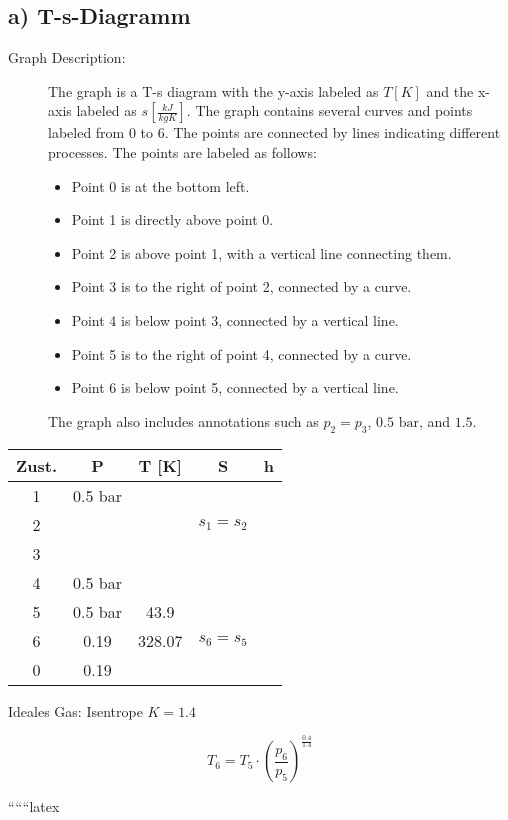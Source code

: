 \subsection*{a) T-s-Diagramm}

\begin{description}
    \item[Graph Description:] The graph is a T-s diagram with the y-axis labeled as $T [K]$ and the x-axis labeled as $s \left[ \frac{kJ}{kgK} \right]$. The graph contains several curves and points labeled from 0 to 6. The points are connected by lines indicating different processes. The points are labeled as follows:
    \begin{itemize}
        \item Point 0 is at the bottom left.
        \item Point 1 is directly above point 0.
        \item Point 2 is above point 1, with a vertical line connecting them.
        \item Point 3 is to the right of point 2, connected by a curve.
        \item Point 4 is below point 3, connected by a vertical line.
        \item Point 5 is to the right of point 4, connected by a curve.
        \item Point 6 is below point 5, connected by a vertical line.
    \end{itemize}
    The graph also includes annotations such as $p_2 = p_3$, $0.5 \text{ bar}$, and $1.5$.
\end{description}

\begin{table}[h!]
    \centering
    \begin{tabular}{|c|c|c|c|c|}
        \hline
        Zust. & P & T [K] & S & h \\
        \hline
        1 & 0.5 bar & & & \\
        \hline
        2 & & & $s_1 = s_2$ & \\
        \hline
        3 & & & & \\
        \hline
        4 & 0.5 bar & & & \\
        \hline
        5 & 0.5 bar & 43.9 & & \\
        \hline
        6 & 0.19 & 328.07 & $s_6 = s_5$ & \\
        \hline
        0 & 0.19 & & & \\
        \hline
    \end{tabular}
\end{table}

\noindent Ideales Gas: Isentrope $K = 1.4$

\[
T_6 = T_5 \cdot \left( \frac{p_6}{p_5} \right)^{\frac{0.4}{1.4}}
\]

``````latex